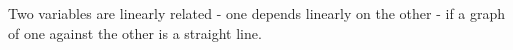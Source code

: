 Two variables are linearly related - one depends
linearly on the other - if a graph of one against
the other is a straight line.